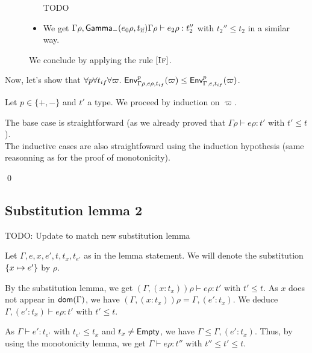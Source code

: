 \documentclass[a4paper]{article}
\theoremstyle{definition}
\begin{document}
\begin{description}
\begin{itemize}
            TODO
    
            \item We get $\Gamma\rho, \textsf{Gamma}_{-}(e_0\rho,t_{\text{if}}) {\Gamma\rho}\vdash e_2\rho:t_2''$ with $t_2'' \leq t_2$ in a similar way.
          \end{itemize}
          We conclude by applying the rule $[\textsc{If}]$.
        \end{description}
    
        Now, let's show that $\forall p \forall t_{if} \forall \varpi.\ \textsf{Env}^{p}_{\Gamma\rho,e\rho,t_{if}} (\varpi) \leq \textsf{Env}^{p}_{\Gamma,e,t_{if}} (\varpi)$.
    
        Let $p\in \{+,-\}$ and $t'$ a type.
        We proceed by induction on $\varpi$.
    
        The base case is straightforward (as we already proved that $\Gamma \rho \vdash e \rho:t'$ with $t'\leq t$).\\
        The inductive cases are also straightfoward using the induction hypothesis (same reasonning as for the proof of monotonicity).
    
        \qed
    
        \subsection{Substitution lemma 2}

        TODO: Update to match new substitution lemma
    
        Let $\Gamma,e,x,e',t,t_x,t_{e'}$ as in the lemma statement.
        We will denote the substitution $\{x \mapsto e'\}$ by $\rho$.
    
        By the substitution lemma, we get $(\Gamma, (x:t_x))\rho \vdash e\rho:t'$ with $t' \leq t$.
        As $x$ does not appear in $\textsf{dom}(\Gamma)$, we have $(\Gamma, (x:t_x))\rho = \Gamma, (e':t_x)$.
        We deduce $\Gamma, (e':t_x) \vdash e\rho:t'$ with $t' \leq t$.
    
        As $\Gamma \vdash e':t_{e'}$ with $t_{e'} \leq t_x$ and $t_x \neq \textsf{Empty}$, we have $\Gamma \leq \Gamma, (e':t_x)$.
        Thus, by using the monotonicity lemma, we get $\Gamma\vdash e\rho:t''$ with $t'' \leq t' \leq t$.
    
\end{document}
